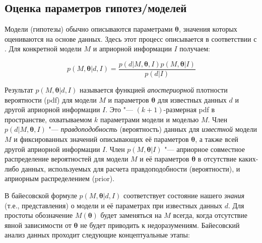 

\subsection{Оценка параметров гипотез/моделей} \label{sect1_2_4}
Модели (гипотезы) обычно описываются параметрами $\boldsymbol{\theta}$, значения которых оцениваются на основе данных. 
Здесь этот процесс описывается в соответствии с \cite{ivezic2019statistics}. Для конкретной модели $M$ и априорной 
информации $I$ получаем:

\begin{equation}
    p(M, \boldsymbol{\theta}|d, I) = \frac{p(d|M, \boldsymbol{\theta}, I) p(M, \boldsymbol{\theta} |I)}{p(d|I)}
\end{equation}

Результат $p(M, \boldsymbol{\theta}|d, I)$ называется функцией \textit{апостериорной} плотности вероятности (pdf) 
для модели $M$ и параметров $\boldsymbol{\theta}$ для известных данных $d$ и другой априорной информации $I$. 
Это "--- $(k + 1)$-размерная pdf в пространстве, охватываемом $k$ параметрами модели и моделью $M$. Член 
$p(d|M, \boldsymbol{\theta}, I)$ "--- \textit{правдоподобность} (вероятность) данных для \textit{известной} 
модели $M$ и фиксированных значений описывающих её параметров $\boldsymbol{\theta}$, а также всей другой 
априорной информации $I$. Член $p(M, \boldsymbol{\theta}|I)$ "--- априорное совместное распределение вероятностей 
для модели $M$ и её параметров $\boldsymbol{\theta}$ в отсутствие каких-либо данных, используемых для расчета 
правдоподобности (вероятности), и априорным распределением (prior).

В байесовской формуле $p(M, \boldsymbol{\theta}|d, I)$ соответствует состояние нашего \textit{знания} (т.е., 
представления) о модели и её параметрах при известных данных $d$. Для простоты обозначение $M(\boldsymbol{\theta})$ 
будет заменяться на $M$ всегда, когда отсутствие явной зависимости от $\boldsymbol{\theta}$ не будет приводить к 
недоразумениям. Байесовский анализ данных проходит следующие концептуальные этапы:

